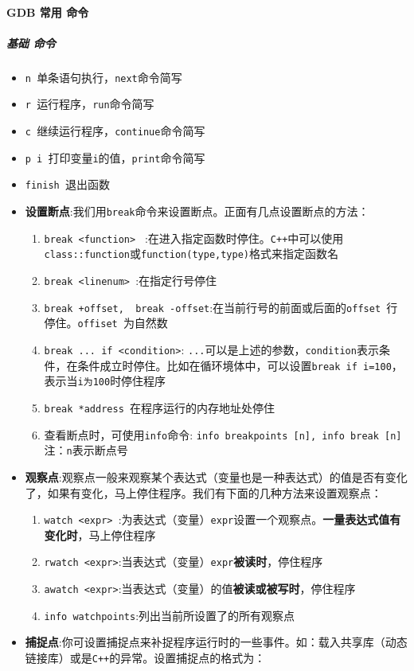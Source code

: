 \documentclass[UTF8,a4paper,12pt]{ctexbook} %
\begin{document}
			\paragraph{GDB 常用 命令}
				\subparagraph{基础 命令}
					 \begin{itemize}[itemindent = 1em]
					 	\item \verb|n |单条语句执行，\verb|next|命令简写
					 	\item \verb|r |运行程序，\verb|run|命令简写
					 	\item \verb|c |继续运行程序，\verb|continue|命令简写
					 	\item \verb|p i |打印变量\verb|i|的值，\verb|print|命令简写
					 	\item \verb|finish |退出函数
					 	\item \textbf{设置断点}:我们用\verb|break|命令来设置断点。正面有几点设置断点的方法：
					 	
						 	\begin{enumerate}
						 		\item \verb|break <function> | :在进入指定函数时停住。\verb|C++|中可以使用\verb|class::function|或\verb|function(type,type)|格式来指定函数名
						 		\item \verb|break <linenum> |:在指定行号停住
						 		\item \verb|break +offset, 	break -offset|:在当前行号的前面或后面的\verb|offset |行停住。\verb|offiset |为自然数
						 		\item \verb|break ... if <condition>|: \verb|...|可以是上述的参数，\verb|condition|表示条件，在条件成立时停住。比如在循环境体中，可以设置\verb|break if i=100|，表示当\verb|i为100|时停住程序
						 		\item \verb|break *address |在程序运行的内存地址处停住
						 		\item 查看断点时，可使用\verb|info|命令: \verb|info breakpoints [n], info break [n]|注：\verb|n|表示断点号
						 	\end{enumerate}
					 	\item \textbf{观察点}:观察点一般来观察某个表达式（变量也是一种表达式）的值是否有变化了，如果有变化，马上停住程序。我们有下面的几种方法来设置观察点：
						 	\begin{enumerate}
						 		\item \verb|watch <expr> |:为表达式（变量）\verb|expr|设置一个观察点。\textbf{一量表达式值有变化时}，马上停住程序
						 		\item \verb|rwatch <expr>|:当表达式（变量）\verb|expr|\textbf{被读时}，停住程序
						 		\item \verb|awatch <expr>|:当表达式（变量）的值\textbf{被读或被写时}，停住程序
						 		\item \verb|info watchpoints|:列出当前所设置了的所有观察点
						 	\end{enumerate}
					 	\item \textbf{捕捉点}:你可设置捕捉点来补捉程序运行时的一些事件。如：载入共享库（动态链接库）或是\verb|C++|的异常。设置捕捉点的格式为：
					 	

\end{itemize}
\end{document}
